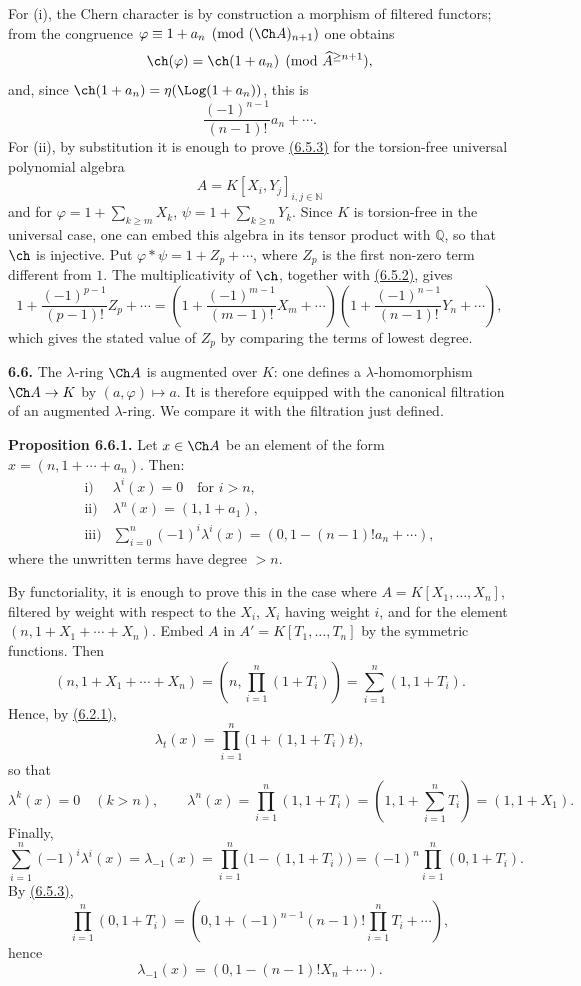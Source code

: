 For (i), the Chern character is by construction a morphism of filtered functors; from the congruence \(\varphi\equiv1+a_n\pmod{(\Ch A)_{n+1}}\) one obtains
\[
  \ch(\varphi)=\ch(1+a_n)\pmod{\widehat A^{\ge n+1}},
\]
and, since \(\ch(1+a_n)=\eta(\Log(1+a_n))\), this is
\[
  \frac{(-1)^{n-1}}{(n-1)!}a_n+\cdots .
\]
For (ii), by substitution it is enough to prove \hyperlink{sga6.e05.eq.6-5-3}{(6.5.3)} for the torsion-free universal polynomial algebra
\[
 A=K[X_i,Y_j]_{i,j\in\mathbb N}
\]
and for \(\varphi=1+\sum_{k\ge m}X_k\), \(\psi=1+\sum_{k\ge n}Y_k\). Since \(K\) is torsion-free in the universal case, one can embed this algebra in its tensor product with \(\mathbb Q\), so that \(\ch\) is injective. Put \(\varphi*\psi=1+Z_p+\cdots\), where \(Z_p\) is the first non-zero term different from \(1\). The multiplicativity of \(\ch\), together with \hyperlink{sga6.e05.eq.6-5-2}{(6.5.2)}, gives
\[
  1+\frac{(-1)^{p-1}}{(p-1)!}Z_p+\cdots
  =
  \left(1+\frac{(-1)^{m-1}}{(m-1)!}X_m+\cdots\right)
  \left(1+\frac{(-1)^{n-1}}{(n-1)!}Y_n+\cdots\right),
\]
which gives the stated value of \(Z_p\) by comparing the terms of lowest degree.

\textbf{6.6.} The \(\lambda\)-ring \(\Ch A\) is augmented over \(K\): one defines a \(\lambda\)-homomorphism \(\Ch A\to K\) by \((a,\varphi)\mapsto a\). It is therefore equipped with the canonical filtration of an augmented \(\lambda\)-ring. We compare it with the filtration just defined.

\textbf{Proposition 6.6.1.} Let \(x\in\Ch A\) be an element of the form \(x=(n,1+\cdots+a_n)\). Then:
\[
\begin{array}{ll}
\text{i)}& \lambda^i(x)=0\quad\text{for }i>n,\\[0.3em]
\text{ii)}& \lambda^n(x)=(1,1+a_1),\\[0.3em]
\text{iii)}& \displaystyle\sum_{i=0}^n(-1)^i\lambda^i(x)
       =(0,1-(n-1)!a_n+\cdots),
\end{array}
\]
where the unwritten terms have degree \(>n\).

By functoriality, it is enough to prove this in the case where
\(A=K[X_1,\ldots,X_n]\), filtered by weight with respect to the \(X_i\), \(X_i\) having weight \(i\), and for the element \((n,1+X_1+\cdots+X_n)\). Embed \(A\) in \(A'=K[T_1,\ldots,T_n]\) by the symmetric functions. Then
\[
 (n,1+X_1+\cdots+X_n)
 =
 \left(n,\prod_{i=1}^n(1+T_i)\right)
 =
 \sum_{i=1}^n(1,1+T_i).
\]
Hence, by \hyperlink{sga6.e05.eq.6-2-1}{(6.2.1)},
\[
  \lambda_t(x)=\prod_{i=1}^n\bigl(1+(1,1+T_i)t\bigr),
\]
so that
\[
  \lambda^k(x)=0\quad(k>n),\qquad
  \lambda^n(x)=\prod_{i=1}^n(1,1+T_i)
   =\left(1,1+\sum_{i=1}^nT_i\right)=(1,1+X_1).
\]
Finally,
\[
  \sum_{i=1}^n(-1)^i\lambda^i(x)=\lambda_{-1}(x)
  =\prod_{i=1}^n\bigl(1-(1,1+T_i)\bigr)
  =(-1)^n\prod_{i=1}^n(0,1+T_i).
\]
By \hyperlink{sga6.e05.eq.6-5-3}{(6.5.3)},
\[
  \prod_{i=1}^n(0,1+T_i)
  =
  \left(0,1+(-1)^{n-1}(n-1)!\prod_{i=1}^nT_i+\cdots\right),
\]
hence
\[
  \lambda_{-1}(x)=(0,1-(n-1)!X_n+\cdots).
\]

